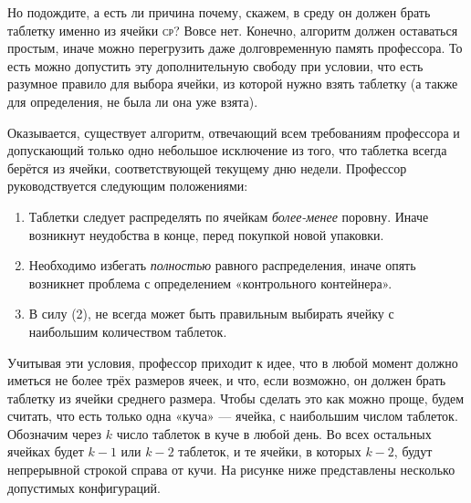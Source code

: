 Но подождите, а есть ли причина почему, скажем, в среду он должен брать таблетку именно из ячейки \textsc{ср}?
Вовсе нет.
Конечно, алгоритм должен оставаться простым, иначе можно перегрузить даже долговременную память профессора.
То есть можно допустить эту дополнительную свободу при условии, что есть разумное правило для выбора ячейки, из которой нужно взять таблетку (а также для определения, не была ли она уже взята).

Оказывается, существует алгоритм, отвечающий всем требованиям профессора и допускающий только одно небольшое исключение из того, что таблетка всегда берётся из ячейки, соответствующей текущему дню недели.
Профессор руководствуется следующим положениями:

\begin{enumerate}[(1)]
\item Таблетки следует распределять по ячейкам \emph{более-менее} поровну.
Иначе возникнут неудобства в конце, перед покупкой новой упаковки.
\item Необходимо избегать \emph{полностью} равного распределения, иначе опять возникнет проблема с определением «контрольного контейнера».
\item В силу (2), не всегда может быть правильным выбирать ячейку с наибольшим количеством таблеток.
\end{enumerate}

Учитывая эти условия, профессор приходит к идее, что в любой момент должно иметься не более трёх размеров ячеек, и что, если возможно, он должен брать таблетку из ячейки среднего размера.
Чтобы сделать это как можно проще, будем считать, что есть только одна «куча» --- ячейка, с наибольшим числом таблеток.
Обозначим через $k$ число таблеток в куче в любой день.
Во всех остальных ячейках будет $k-1$ или $k-2$ таблеток, и те ячейки, в которых $k-2$, будут непрерывной строкой справа от кучи.
На рисунке ниже представлены несколько допустимых конфигураций.

